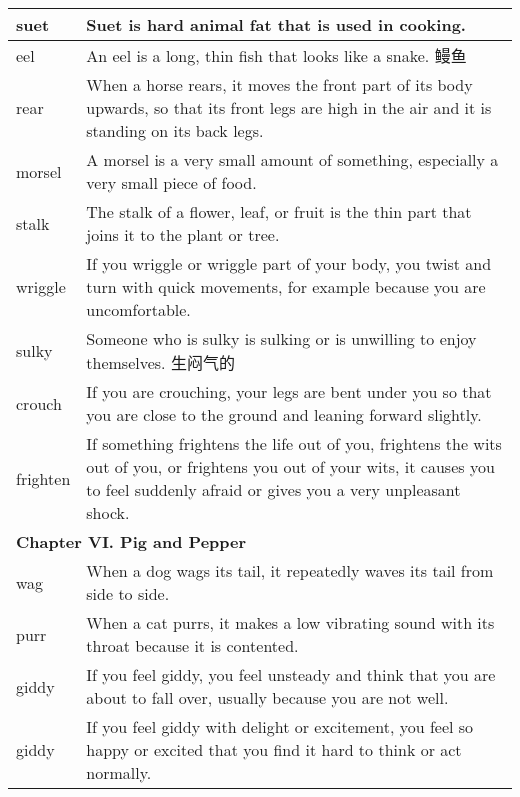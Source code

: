 \documentclass{article}
\begin{document}
\begin{center}
\begin{longtable}{|l|p{9cm}|}
\hline
suet
&
Suet is hard animal fat that is used in cooking.
\\


\hline
eel
&
An eel is a long, thin fish that looks like a snake. 鳗鱼
\\

\hline
rear
&
When a horse rears, it moves the front part of its body upwards, so that its front legs are high in the air and it is standing on its back legs.
\\

\hline
morsel
&
A morsel is a very small amount of something, especially a very small piece of food.
\\

\hline
stalk
&
The stalk of a flower, leaf, or fruit is the thin part that joins it to the plant or tree.
\\

\hline
wriggle
&
If you wriggle or wriggle part of your body, you twist and turn with quick movements, for example because you are uncomfortable.
\\

\hline
sulky
&
Someone who is sulky is sulking or is unwilling to enjoy themselves. 生闷气的
\\

\hline
crouch
&
If you are crouching, your legs are bent under you so that you are close to the ground and leaning forward slightly.
\\

\hline
frighten
&
If something frightens the life out of you, frightens the wits out of you, or frightens you out of your wits, it causes you to feel suddenly afraid or gives you a very unpleasant shock.
\\

\hline
\multicolumn{2}{|l|}{\textbf{Chapter VI. Pig and Pepper}}\\

\hline
wag
&
When a dog wags its tail, it repeatedly waves its tail from side to side.
\\

\hline
purr
&
When a cat purrs, it makes a low vibrating sound with its throat because it is contented.
\\

\hline
giddy
&
If you feel giddy, you feel unsteady and think that you are about to fall over, usually because you are not well.
\\

\hline
giddy
&
If you feel giddy with delight or excitement, you feel so happy or excited that you find it hard to think or act normally.
\\


\end{longtable}
\end{center}
\end{document}
